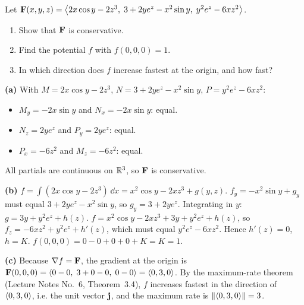 \begin{problem}[$*$]\label{q:mixed1}
Let $\mathbf{F}(x,y,z)=\left\langle 2x\cos y-2z^3,\;3+2ye^z-x^2\sin y,\;y^2e^z-6xz^2 \right\rangle$.
\begin{enumerate}[label=(\alph*)]
\item Show that $\mathbf{F}$ is conservative.
\item Find the potential $f$ with $f(0,0,0)=1$.
\item In which direction does $f$ increase fastest at the origin, and how fast?
\end{enumerate}
\end{problem}
\begin{solution}
\textbf{(a)} With $M=2x\cos y-2z^3$, $N=3+2ye^z-x^2\sin y$, $P=y^2e^z-6xz^2$:
\begin{itemize}
\item $M_y=-2x\sin y$ and $N_x=-2x\sin y$: equal.
\item $N_z=2ye^z$ and $P_y=2ye^z$: equal.
\item $P_x=-6z^2$ and $M_z=-6z^2$: equal.
\end{itemize}
All partials are continuous on $\mathbb{R}^3$, so $\mathbf{F}$ is conservative.

\textbf{(b)}
 $f=\int(2x\cos y-2z^3)\,\dd x=x^2\cos y-2xz^3+g(y,z)$.
 $f_y=-x^2\sin y+g_y$ must equal $3+2ye^z-x^2\sin y$, so
$g_y=3+2ye^z$. Integrating in $y$: $g=3y+y^2e^z+h(z)$.
 $f=x^2\cos y-2xz^3+3y+y^2e^z+h(z)$, so
$f_z=-6xz^2+y^2e^z+h'(z)$, which must equal $y^2e^z-6xz^2$. Hence $h'(z)=0$, $h=K$.
 $f(0,0,0)=0-0+0+0+K=K=1$.

\textbf{(c)} Because $\nabla f=\mathbf{F}$, the gradient at the origin is
$\mathbf{F}(0,0,0)=\left\langle 0-0,\;3+0-0,\;0-0 \right\rangle=\left\langle 0,3,0 \right\rangle$. By the maximum-rate theorem
(Lecture Notes No.~6, Theorem~3.4), $f$ increases fastest in the direction of $\left\langle 0,3,0 \right\rangle$,
i.e. the unit vector $\mathbf{j}$, and the maximum rate is $\lVert\left\langle 0,3,0 \right\rangle\rVert=3$.
\end{solution}

